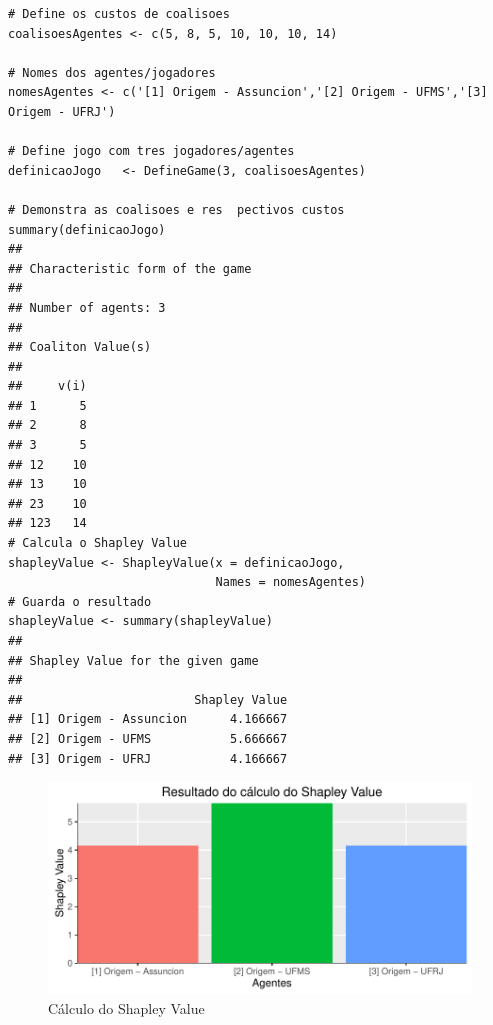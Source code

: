 \documentclass[
	article,			        %
	11pt,				          %
	oneside,			        %
	a4paper,			        %
	english,			        %
	brazil,				        %
	sumario=tradicional
]{abntex2}\usepackage[]{graphicx}\usepackage[]{color}
\makeatletter
\def\maxwidth{ %
  \ifdim\Gin@nat@width>\linewidth
    \linewidth
  \else
    \Gin@nat@width
  \fi
}
\newenvironment{kframe}{%
 \def\at@end@of@kframe{}%
 \ifinner\ifhmode%
  \def\at@end@of@kframe{\end{minipage}}%
  \begin{minipage}{\columnwidth}%
 \fi\fi%
 \def\FrameCommand##1{\hskip\@totalleftmargin \hskip-\fboxsep
 \colorbox{shadecolor}{##1}\hskip-\fboxsep
     \hskip-\linewidth \hskip-\@totalleftmargin \hskip\columnwidth}%
 \MakeFramed {\advance\hsize-\width
   \@totalleftmargin\z@ \linewidth\hsize
   \@setminipage}}%
 {\par\unskip\endMakeFramed%
 \at@end@of@kframe}
\newenvironment{knitrout}{}{} %
\makeatother
\begin{document}
\begin{knitrout}
\color{fgcolor}\begin{kframe}
\begin{verbatim}
# Define os custos de coalisoes
coalisoesAgentes <- c(5, 8, 5, 10, 10, 10, 14)

# Nomes dos agentes/jogadores
nomesAgentes <- c('[1] Origem - Assuncion','[2] Origem - UFMS','[3] Origem - UFRJ')

# Define jogo com tres jogadores/agentes
definicaoJogo   <- DefineGame(3, coalisoesAgentes)

# Demonstra as coalisoes e res  pectivos custos
summary(definicaoJogo)
## 
## Characteristic form of the game 
## 
## Number of agents: 3 
## 
## Coaliton Value(s) 
## 
##     v(i)
## 1      5
## 2      8
## 3      5
## 12    10
## 13    10
## 23    10
## 123   14
# Calcula o Shapley Value
shapleyValue <- ShapleyValue(x = definicaoJogo, 
                             Names = nomesAgentes)
# Guarda o resultado
shapleyValue <- summary(shapleyValue)
## 
## Shapley Value for the given game 
## 
##                        Shapley Value
## [1] Origem - Assuncion      4.166667
## [2] Origem - UFMS           5.666667
## [3] Origem - UFRJ           4.166667
\end{verbatim}
\end{kframe}
\end{knitrout}

\begin{knitrout}
\color{fgcolor}\begin{figure}[H]

{\centering \includegraphics[width=\maxwidth]{figure/unnamed-chunk-4-1} 

}

\caption[Cálculo do Shapley Value]{Cálculo do Shapley Value}\label{fig:unnamed-chunk-4}
\end{figure}


\end{knitrout}
\end{document}
